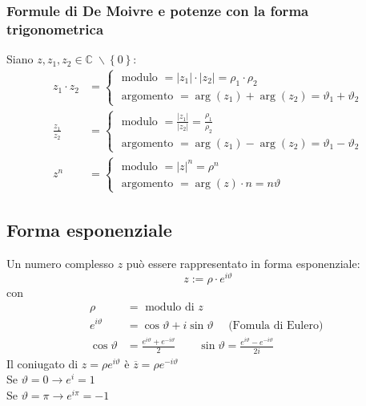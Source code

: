 \documentclass[a4paper]{article}
\begin{document}
\subsubsection*{Formule di De Moivre e potenze con la forma trigonometrica}
Siano \(z, z_1, z_2 \in \mathbb{C} \; \backslash \left\{ 0 \right\}\):
\begin{align*}
	z_1 \cdot z_2 &= 
	\begin{cases}
		\text{ modulo } = \left| z_1 \right| \cdot \left| z_2 \right| = \rho_1 \cdot \rho_2 \\
		\text{ argomento } = \arg(z_1) + \arg(z_2) = \vartheta_1 + \vartheta_2
	\end{cases} \\
	\frac{z_1}{z_2} &= 
	\begin{cases}
		\displaystyle \text{ modulo } = \frac{\left| z_1 \right|}{\left| z_2 \right|} = \frac{\rho_1}{\rho_2}\\
		\text{ argomento } = \arg(z_1) - \arg(z_2) = \vartheta_1 - \vartheta_2
	\end{cases} \\
	z ^ n &= 
	\begin{cases}
		\text{ modulo } = \left| z \right| ^ n = \rho ^ n \\
		\text{ argomento } = \arg(z) \cdot n = n \vartheta
	\end{cases}
\end{align*}

\newpage


\subsection{Forma esponenziale}
Un numero complesso \(z\) può essere rappresentato in forma esponenziale:
\[z := \rho \cdot e ^ {i \vartheta}\]
con
\begin{align*}
	\rho &= \text{ modulo di } z\\
	e^{i\vartheta} &= \cos \vartheta + i \sin \vartheta \quad \text{ (Fomula di Eulero) } \\
	\cos \vartheta &= \frac{e ^ {i \vartheta} + e ^ {-i \vartheta}}{2} \qquad \sin \vartheta = \frac{e ^ {i \vartheta} - e ^ {-i \vartheta}}{2i}
\end{align*}
Il coniugato di  \(z = \rho e ^ {i \vartheta}\) è \(\overline{z} = \rho e ^ {-i \vartheta}\) \\
Se \(\vartheta = 0 \to e ^ i = 1\) \\
Se \(\vartheta = \pi \to e ^ {i\pi} = -1\)
\end{document}
